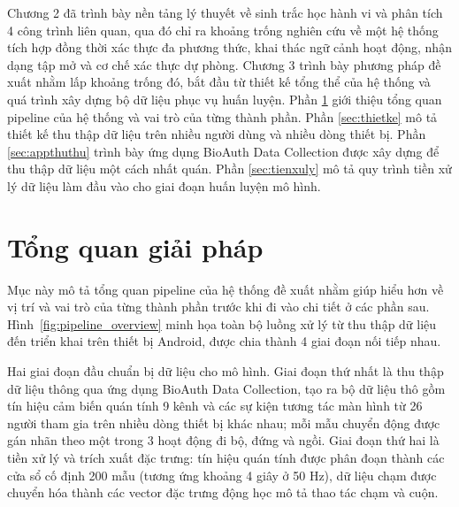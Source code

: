\documentclass[../DoAn.tex]{subfiles}
\begin{document}
Chương 2 đã trình bày nền tảng lý thuyết về sinh trắc học hành vi và phân tích 4 công trình liên quan, qua đó chỉ ra khoảng trống nghiên cứu về một hệ thống tích hợp đồng thời xác thực đa phương thức, khai thác ngữ cảnh hoạt động, nhận dạng tập mở và cơ chế xác thực dự phòng. Chương 3 trình bày phương pháp đề xuất nhằm lấp khoảng trống đó, bắt đầu từ thiết kế tổng thể của hệ thống và quá trình xây dựng bộ dữ liệu phục vụ huấn luyện. Phần \ref{sec:tongquan_giaiphap} giới thiệu tổng quan pipeline của hệ thống và vai trò của từng thành phần. Phần \ref{sec:thietke} mô tả thiết kế thu thập dữ liệu trên nhiều người dùng và nhiều dòng thiết bị. Phần \ref{sec:appthuthu} trình bày ứng dụng BioAuth Data Collection được xây dựng để thu thập dữ liệu một cách nhất quán. Phần \ref{sec:tienxuly} mô tả quy trình tiền xử lý dữ liệu làm đầu vào cho giai đoạn huấn luyện mô hình.

\section{Tổng quan giải pháp}
\label{sec:tongquan_giaiphap}

Mục này mô tả tổng quan pipeline của hệ thống đề xuất nhằm giúp hiểu hơn về vị trí và vai trò của từng thành phần trước khi đi vào chi tiết ở các phần sau. Hình~\ref{fig:pipeline_overview} minh họa toàn bộ luồng xử lý từ thu thập dữ liệu đến triển khai trên thiết bị Android, được chia thành 4 giai đoạn nối tiếp nhau.

Hai giai đoạn đầu chuẩn bị dữ liệu cho mô hình. Giai đoạn thứ nhất là thu thập dữ liệu thông qua ứng dụng BioAuth Data Collection, tạo ra bộ dữ liệu thô gồm tín hiệu cảm biến quán tính 9 kênh và các sự kiện tương tác màn hình từ 26 người tham gia trên nhiều dòng thiết bị khác nhau; mỗi mẫu chuyển động được gán nhãn theo một trong 3 hoạt động đi bộ, đứng và ngồi. Giai đoạn thứ hai là tiền xử lý và trích xuất đặc trưng: tín hiệu quán tính được phân đoạn thành các cửa sổ cố định 200 mẫu (tương ứng khoảng 4 giây ở 50 Hz), dữ liệu chạm được chuyển hóa thành các vector đặc trưng động học mô tả thao tác chạm và cuộn.
\end{document}
